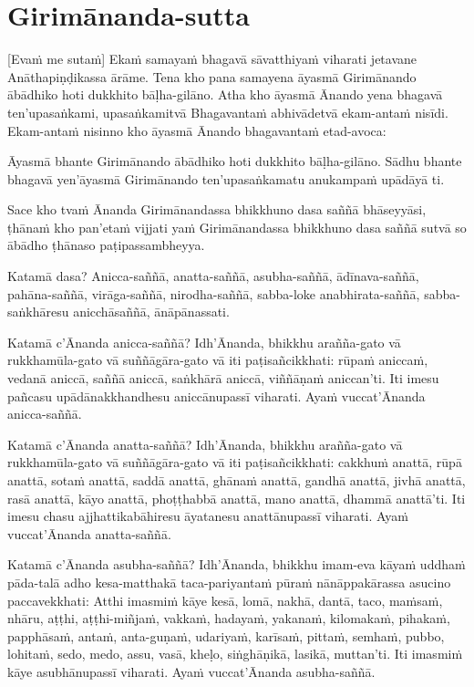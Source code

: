 \section{Girimānanda-sutta}

[Evaṁ me sutaṁ] 
Ekaṁ samayaṁ bhagavā sāvatthiyaṁ viharati jetavane
Anāthapiṇḍikassa ārāme. Tena kho pana samayena āyasmā Girimānando ābādhiko hoti
dukkhito bāḷha-gilāno. Atha kho āyasmā Ānando yena bhagavā ten’upasaṅkami,
upasaṅkamitvā Bhagavantaṁ abhivādetvā ekam-antaṁ nisīdi. Ekam-antaṁ nisinno kho
āyasmā Ānando bhagavantaṁ etad-avoca:

Āyasmā bhante Girimānando ābādhiko hoti dukkhito bāḷha-gilāno. Sādhu bhante
bhagavā yen’āyasmā Girimānando ten’upasaṅkamatu anukampaṁ upādāyā ti.

Sace kho tvaṁ Ānanda Girimānandassa bhikkhuno dasa saññā bhāseyyāsi, ṭhānaṁ kho
pan’etaṁ vijjati yaṁ Girimānandassa bhikkhuno dasa saññā sutvā so ābādho ṭhānaso
paṭipassambheyya.

Katamā dasa? Anicca-saññā, anatta-saññā, asubha-saññā, ādīnava-saññā,
pahāna-saññā, virāga-saññā, nirodha-saññā, sabba-loke anabhirata-saññā,
sabba-saṅkhāresu anicchāsaññā, ānāpānassati.

Katamā c’Ānanda anicca-saññā? Idh’Ānanda, bhikkhu arañña-gato vā
rukkhamūla-gato vā suññāgāra-gato vā iti paṭisañcikkhati: rūpaṁ aniccaṁ, vedanā
aniccā, saññā aniccā, saṅkhārā aniccā, viññāṇaṁ aniccan’ti. Iti imesu pañcasu
upādānakkhandhesu aniccānupassī viharati. Ayaṁ vuccat’Ānanda anicca-saññā.

Katamā c’Ānanda anatta-saññā? Idh’Ānanda, bhikkhu arañña-gato vā
rukkhamūla-gato vā suññāgāra-gato vā iti paṭisañcikkhati: cakkhuṁ anattā, rūpā
anattā, sotaṁ anattā, saddā anattā, ghānaṁ anattā, gandhā anattā, jivhā anattā,
rasā anattā, kāyo anattā, phoṭṭhabbā anattā, mano anattā, dhammā anattā’ti. Iti
imesu chasu ajjhattikabāhiresu āyatanesu anattānupassī viharati. Ayaṁ
vuccat’Ānanda anatta-saññā.

Katamā c’Ānanda asubha-saññā? Idh’Ānanda, bhikkhu imam-eva kāyaṁ uddhaṁ
pāda-talā adho kesa-matthakā taca-pariyantaṁ pūraṁ nānāppakārassa asucino
paccavekkhati: Atthi imasmiṁ kāye kesā, lomā, nakhā, dantā, taco, maṁsaṁ,
nhāru, aṭṭhi, aṭṭhi-miñjaṁ, vakkaṁ, hadayaṁ, yakanaṁ, kilomakaṁ, pihakaṁ,
papphāsaṁ, antaṁ, anta-guṇaṁ, udariyaṁ, karīsaṁ, pittaṁ, semhaṁ, pubbo, lohitaṁ,
sedo, medo, assu, vasā, kheḷo, siṅghāṇikā, lasikā, muttan’ti. Iti imasmiṁ kāye
asubhānupassī viharati. Ayaṁ vuccat’Ānanda asubha-saññā.

